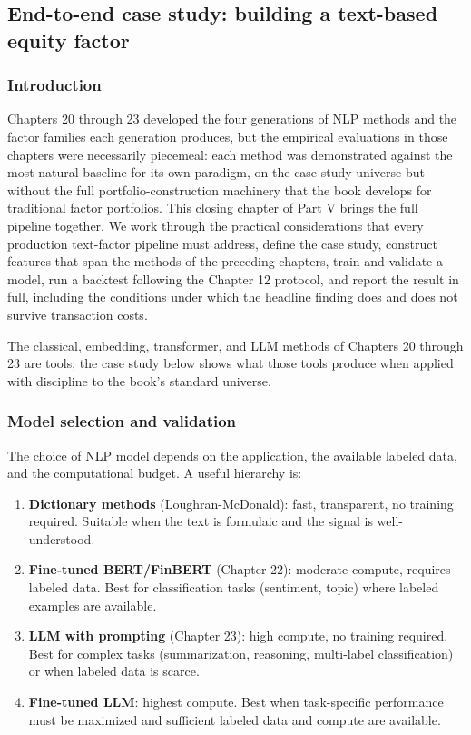 \subsection{End-to-end case study: building a text-based equity factor}

% 
%

\subsubsection{Introduction}

Chapters 20 through 23 developed the four generations of NLP methods and the factor families each generation produces, but the empirical evaluations in those chapters were necessarily piecemeal: each method was demonstrated against the most natural baseline for its own paradigm, on the case-study universe but without the full portfolio-construction machinery that the book develops for traditional factor portfolios. This closing chapter of Part V brings the full pipeline together. We work through the practical considerations that every production text-factor pipeline must address, define the case study, construct features that span the methods of the preceding chapters, train and validate a model, run a backtest following the Chapter 12 protocol, and report the result in full, including the conditions under which the headline finding does and does not survive transaction costs.

The classical, embedding, transformer, and LLM methods of Chapters 20 through 23 are tools; the case study below shows what those tools produce when applied with discipline to the book's standard universe.

\subsubsection{Model selection and validation}

The choice of NLP model depends on the application, the available labeled data, and the computational budget. A useful hierarchy is:

\begin{enumerate}
\item \textbf{Dictionary methods} (Loughran-McDonald): fast, transparent, no training required. Suitable when the text is formulaic and the signal is well-understood.
\item \textbf{Fine-tuned BERT/FinBERT} (Chapter 22): moderate compute, requires labeled data. Best for classification tasks (sentiment, topic) where labeled examples are available.
\item \textbf{LLM with prompting} (Chapter 23): high compute, no training required. Best for complex tasks (summarization, reasoning, multi-label classification) or when labeled data is scarce.
\item \textbf{Fine-tuned LLM}: highest compute. Best when task-specific performance must be maximized and sufficient labeled data and compute are available.
\end{enumerate}

